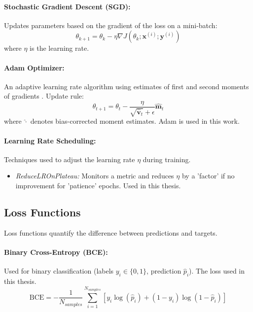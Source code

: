 \begin{appendices}
  \paragraph{Stochastic Gradient Descent (SGD):}
  Updates parameters based on the gradient of the loss on a mini-batch:
  \begin{equation}
    \theta_{k+1} = \theta_k - \eta \nabla J(\theta_k; \bm{x}^{(i)}; \bm{y}^{(i)})
  \end{equation}
  where \( \eta \) is the learning rate.

  \paragraph{Adam Optimizer:}
  \label{eq:adam} %
  An adaptive learning rate algorithm using estimates of first and second moments of gradients \autocite{kingma2014adam}. Update rule:
  \begin{equation}
    \theta_{t+1} = \theta_t - \frac{\eta}{\sqrt{\hat{\bm{v}}_t} + \epsilon} \hat{\bm{m}}_t
    \label{eq:adam-update} %
  \end{equation}
  where \( \hat{\cdot} \) denotes bias-corrected moment estimates. Adam is used in this work.

  \paragraph{Learning Rate Scheduling:}
  Techniques used to adjust the learning rate \( \eta \) during training.
  \begin{itemize}
    \item \textit{ReduceLROnPlateau:} Monitors a metric and reduces \( \eta \) by a 'factor' if no improvement for 'patience' epochs. Used in this thesis.
  \end{itemize}

  \subsection{Loss Functions}
  Loss functions quantify the difference between predictions and targets.

  \paragraph{Binary Cross-Entropy (BCE):}
  \label{eq:bce} %
  Used for binary classification (labels \( y_i \in \{0, 1\} \), prediction \( \hat{p}_i \)). The loss used in this thesis.
  \begin{equation}
    \text{BCE} = -\frac{1}{N_{samples}} \sum_{i=1}^{N_{samples}} [ y_i \log(\hat{p}_i) + (1 - y_i) \log(1 - \hat{p}_i) ]
  \end{equation}


\end{appendices}
